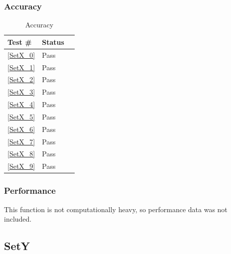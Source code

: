 \documentclass[12pt]{article}
\begin{document}
	\subsubsection{Accuracy}
		\begin{table}[H]
		\centering
		\caption{Accuracy}\label{GetY_acc}
		\begin{tabular}{lll}
		\toprule
		\bf Test \# & Status \\\midrule
		\ref{SetX_0} & Pass\\
		\ref{SetX_1} & Pass\\
		\ref{SetX_2} & Pass\\
		\ref{SetX_3} & Pass\\
		\ref{SetX_4} & Pass\\
		\ref{SetX_5} & Pass\\
		\ref{SetX_6} & Pass\\
		\ref{SetX_7} & Pass\\
		\ref{SetX_8} & Pass\\
		\ref{SetX_9} & Pass\\
		\bottomrule
		\end{tabular}
		\end{table}
	\subsubsection{Performance}
			This function is not computationally heavy, so performance data was not included.
			
\subsection{SetY}
\end{document}
